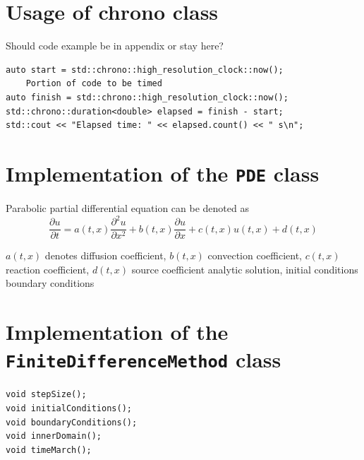 \documentclass[12pt, oneside]{book}
\theoremstyle{plain}
\theoremstyle{definition}
\begin{document}
\appendix
\chapter{Usage of chrono class}
Should code example be in appendix or stay here?
\begin{verbatim}
auto start = std::chrono::high_resolution_clock::now();
    Portion of code to be timed
auto finish = std::chrono::high_resolution_clock::now();
std::chrono::duration<double> elapsed = finish - start;
std::cout << "Elapsed time: " << elapsed.count() << " s\n";
\end{verbatim}

\chapter{Implementation of the {\tt PDE} class}
Parabolic partial differential equation can be denoted as
$$ \frac{\partial u}{\partial t} = a(t,x) \frac{\partial^2 u}{\partial x^2} + b(t,x) \frac{\partial u}{\partial x} + c(t,x) u(t,x) + d(t,x) $$

$a(t,x)$ denotes diffusion coefficient,  $b(t,x)$ convection coefficient, $c(t,x)$ reaction coefficient, $d(t,x)$ source coefficient
analytic solution, initial conditions boundary conditions
\chapter{Implementation of the {\tt FiniteDifferenceMethod} class}

\begin{verbatim}
void stepSize();
void initialConditions();
void boundaryConditions();
void innerDomain();
void timeMarch();
\end{verbatim}





\end{document}
